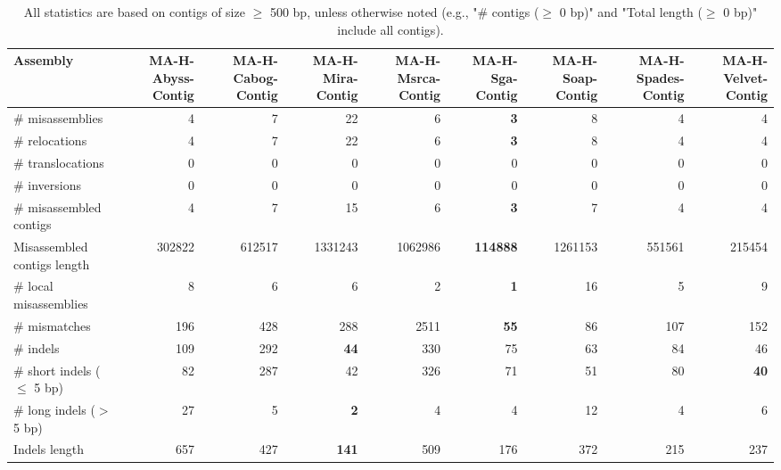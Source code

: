 \documentclass[12pt,a4paper]{article}
\begin{document}
\begin{table}[ht]
\begin{center}
\caption{All statistics are based on contigs of size $\geq$ 500 bp, unless otherwise noted (e.g., "\# contigs ($\geq$ 0 bp)" and "Total length ($\geq$ 0 bp)" include all contigs).}
\begin{tabular}{|l*{8}{|r}|}
\hline
Assembly & MA-H-Abyss-Contig & MA-H-Cabog-Contig & MA-H-Mira-Contig & MA-H-Msrca-Contig & MA-H-Sga-Contig & MA-H-Soap-Contig & MA-H-Spades-Contig & MA-H-Velvet-Contig \\ \hline
\# misassemblies & 4 & 7 & 22 & 6 & {\bf 3} & 8 & 4 & 4 \\ \hline
\hspace{5mm}\# relocations & 4 & 7 & 22 & 6 & {\bf 3} & 8 & 4 & 4 \\ \hline
\hspace{5mm}\# translocations & 0 & 0 & 0 & 0 & 0 & 0 & 0 & 0 \\ \hline
\hspace{5mm}\# inversions & 0 & 0 & 0 & 0 & 0 & 0 & 0 & 0 \\ \hline
\# misassembled contigs & 4 & 7 & 15 & 6 & {\bf 3} & 7 & 4 & 4 \\ \hline
Misassembled contigs length & 302822 & 612517 & 1331243 & 1062986 & {\bf 114888} & 1261153 & 551561 & 215454 \\ \hline
\# local misassemblies & 8 & 6 & 6 & 2 & {\bf 1} & 16 & 5 & 9 \\ \hline
\# mismatches & 196 & 428 & 288 & 2511 & {\bf 55} & 86 & 107 & 152 \\ \hline
\# indels & 109 & 292 & {\bf 44} & 330 & 75 & 63 & 84 & 46 \\ \hline
\hspace{5mm}\# short indels ($\leq$ 5 bp) & 82 & 287 & 42 & 326 & 71 & 51 & 80 & {\bf 40} \\ \hline
\hspace{5mm}\# long indels ($>$ 5 bp) & 27 & 5 & {\bf 2} & 4 & 4 & 12 & 4 & 6 \\ \hline
Indels length & 657 & 427 & {\bf 141} & 509 & 176 & 372 & 215 & 237 \\ \hline
\end{tabular}
\end{center}
\end{table}
\end{document}
